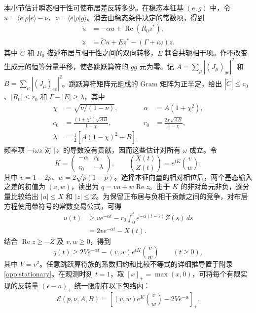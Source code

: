 \documentclass[aps,pra,reprint,amsmath,amssymb,nofootinbib,floatfix,longbibliography]{revtex4-2}
\theoremstyle{aps}
\newcommand{\eps}{\epsilon}
\newcommand{\pos}[1]{\left[#1\right]_+}
\newcommand{\ket}[1]{|#1\rangle}
\newcommand{\bra}[1]{\langle#1|}
\begin{document}
本小节估计瞬态相干性可使布居差反转多少。在稳态本征基 $(e,g)$ 中，令 $u=\bra e\rho\ket e-\nu$、$z=\bra e\rho\ket g$。消去由稳态条件决定的常数项，得到
\begin{equation}\label{eq:core-system}
 \begin{aligned}
 \dot u&=-\alpha u+\operatorname{Re}(R_0z^*),\\
 \dot z&=\widetilde C u+Ez^*-(\Gamma+i\omega)z .
 \end{aligned}
\end{equation}
其中 $\widetilde C$ 和 $R_0$ 描述布居与相干性之间的双向转移，$E$ 耦合共轭相干项。作不改变生成元的恒等分量平移，使各跳跃算符的 $gg$ 元为零。记 $A=\sum_\mu|(J_\mu)_{ge}|^2$ 和 $B=\sum_\mu|(J_\mu)_{ee}|^2$。跳跃算符矩阵元组成的 Gram 矩阵为正半定，给出 $|\widetilde C|\le c_0$、$|R_0|\le r_0$ 和 $\Gamma-|E|\ge\lambda$，其中
\[
 \begin{aligned}
 \chi&=\sqrt{\nu/(1-\nu)}, &\alpha&=A(1+\chi^2),\\
 c_0&=\frac{(1+\chi^2)\sqrt{AB}}{1-\chi},&
 r_0&=\frac{2\chi\sqrt{AB}}{1-\chi},\\
 \lambda&=\tfrac12[A(1-\chi)^2+B].&&
 \end{aligned}
\]
频率项 $-i\omega z$ 对 $|z|$ 的导数没有贡献，因而这些估计对所有 $\omega$ 成立。令
\[
 K=\begin{pmatrix}-\alpha&r_0\\c_0&-\lambda\end{pmatrix},
 \qquad \binom{X(t)}{Z(t)}=e^{tK}\binom vw ,
\]
其中 $v=1-2p$、$w=2\sqrt{p(1-p)}$。选择本征向量的相对相位后，两个基态输入之差的初值为 $(v,w)$，读出为 $q=vu+w\operatorname{Re}z$。由于 $K$ 的非对角元非负，逐分量比较给出 $|u|\le X$ 和 $|z|\le Z$。为保留正布居与负相干贡献之间的竞争，对布居方程使用带符号的常数变易公式，可得
\[
 \begin{aligned}
 u(t)&\ge ve^{-\alpha t}
       -r_0\int_0^t e^{-\alpha(t-s)}Z(s)\,ds\\
     &=2ve^{-\alpha t}-X(t).
 \end{aligned}
\]
结合 $\operatorname{Re}z\ge-Z$ 及 $v,w\ge0$，得到
\begin{equation}\label{eq:comparison}
 q(t)\ge 2Ve^{-\alpha t}-(v,w)e^{tK}\binom vw
 \qquad(t\ge0),
\end{equation}
其中 $V=v^2$。任意跳跃算符族的系数归约和比较不等式的详细推导置于附录 \ref{app:stationary}。在观测时刻 $t=1$，取 $[x]_+=\max(x,0)$，可将每个有限实现的反转量 $(\eps-a)_+$ 统一限制在以下包络内：
\begin{equation}\label{eq:envelope}
 \mathcal E(p,\nu,A,B)=\pos{(v,w)e^K\binom vw-2Ve^{-\alpha}}.
\end{equation}
\end{document}
